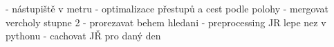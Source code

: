 - nástupiště v metru - optimalizace přestupů a cest podle polohy
- mergovat vercholy stupne 2
- prorezavat behem hledani
- preprocessing JR lepe nez v pythonu
- cachovat JŘ pro daný den
